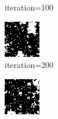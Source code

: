 \documentclass{article}
\begin{document}
\begin{figure}[h]
\begin{subfigure}[t]{0.18\textwidth}
\vspace{-0.6cm}
\caption{iteration=100}
\end{subfigure}\hspace{0.01\textwidth}
\begin{subfigure}[t]{0.18\textwidth}
\centering
\includegraphics[width=\textwidth]{./computational/results/gibbs_node_sampler_negative_iter_200.png}
\vspace{-0.6cm}
\caption{iteration=200}
\end{subfigure}\hspace{0.01\textwidth}
\begin{subfigure}[t]{0.18\textwidth}
\centering
\includegraphics[width=\textwidth]{./computational/results/gibbs_node_sampler_negative_iter_300.png}

\end{subfigure}
\end{figure}
\end{document}

